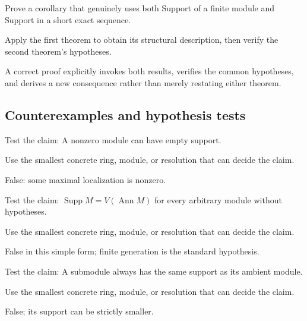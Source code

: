 \begin{exercise}\label{exr:v16-expand-09}
Prove a corollary that genuinely uses both Support of a finite module and Support in a short exact sequence.
\end{exercise}
\begin{hint}
Apply the first theorem to obtain its structural description, then verify the second theorem's hypotheses.
\end{hint}
\begin{solution}
A correct proof explicitly invokes both results, verifies the common hypotheses, and derives a new consequence rather than merely restating either theorem.
\end{solution}

\subsection*{Counterexamples and hypothesis tests}

\begin{exercise}\label{exr:v16-expand-10}
Test the claim: A nonzero module can have empty support.
\end{exercise}
\begin{hint}
Use the smallest concrete ring, module, or resolution that can decide the claim.
\end{hint}
\begin{solution}
False: some maximal localization is nonzero.
\end{solution}

\begin{exercise}\label{exr:v16-expand-11}
Test the claim: $\operatorname{Supp}M=V(\operatorname{Ann}M)$ for every arbitrary module without hypotheses.
\end{exercise}
\begin{hint}
Use the smallest concrete ring, module, or resolution that can decide the claim.
\end{hint}
\begin{solution}
False in this simple form; finite generation is the standard hypothesis.
\end{solution}

\begin{exercise}\label{exr:v16-expand-12}
Test the claim: A submodule always has the same support as its ambient module.
\end{exercise}
\begin{hint}
Use the smallest concrete ring, module, or resolution that can decide the claim.
\end{hint}
\begin{solution}
False; its support can be strictly smaller.
\end{solution}

